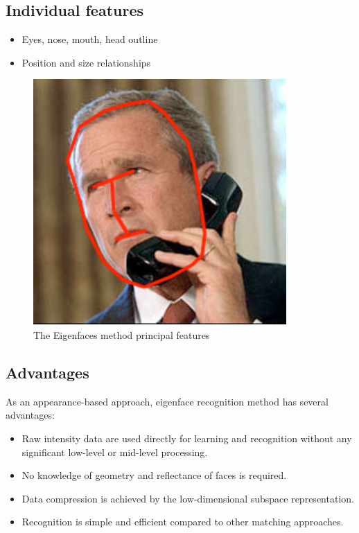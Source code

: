 \documentclass[a4paper,12pt]{report}
\begin{document}
		\subsection{Individual features}
			
			\begin{itemize}
				\item {Eyes, nose, mouth, head outline}
				\item {Position and size relationships}
			\end{itemize}
			
			\begin{figure}[h]
				\centering
				\caption{\label{face recognation} The Eigenfaces method principal features\cite{haar_lbp_hog_comp_pdf}}
				\includegraphics[scale=0.55]{capture0.png}
			\end{figure}
			
		\subsection{Advantages}
			As an appearance-based approach, eigenface recognition method has several advantages:
			\begin{itemize}
				\item {Raw intensity data are used directly for learning and recognition without any significant low-level or mid-level processing.}
				\item {No knowledge of geometry and reflectance of faces is required.}
				\item {Data compression is achieved by the low-dimensional subspace representation.}
				\item {Recognition is simple and efficient compared to other matching approaches.}
			\end{itemize}
			
\end{document}

